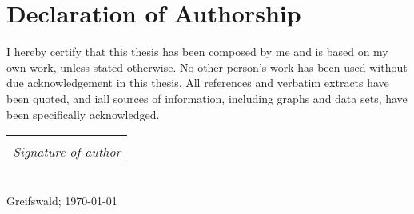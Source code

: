 \documentclass[
	10pt,
	twoside,
	chapterinoneline,
	onehalfspacing, %
	nolistspacing, %
	parskip, %
	headsepline, %
	english,
]{MastersDoctoralThesis} %
\makeatletter
\newcommand{\sign}[1]{%
  \begin{tabular}[t]{@{}c@{}}
  \makebox[1.5in]{\dotfill}\\
  \strut\emph{#1}\strut%
  \end{tabular}%
}
\makeatother
\begin{document}
	\chapter*{Declaration of Authorship}
%
		I hereby certify that this thesis has been composed by me and is based on 
		my own work, unless stated otherwise.	No other person’s work has been used
		without due acknowledgement in this thesis.
		All references and verbatim extracts have been quoted, and iall sources of
		information, including graphs and data sets, have been specifically
		acknowledged.\\[2.0cm]
%
		\begin{flushright}
			\sign{Signature of author}\\
			Greifswald; \today
		\end{flushright}
%
%
	\tableofcontents %
%
	
	\mainmatter%
	\pagestyle{thesis}
% 
	
%
	
	
	
	
	
	
	
	
	
	
	
	
	
	
	
	
%	
	\appendix %
\end{document}
